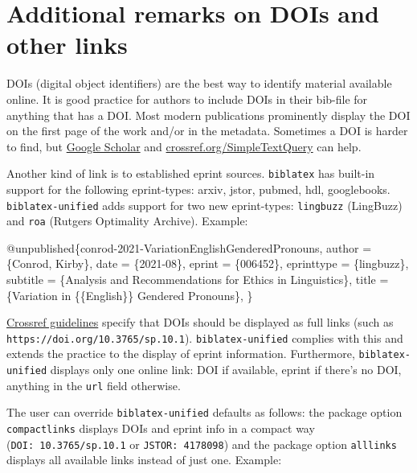 \documentclass[
]{article}
\newenvironment{Shaded}{\begin{snugshade}}{\end{snugshade}}
\newcommand{\DataTypeTok}[1]{\textcolor[rgb]{0.00,0.34,0.68}{#1}}
\newcommand{\NormalTok}[1]{\textcolor[rgb]{0.12,0.11,0.11}{#1}}
\newcommand{\OtherTok}[1]{\textcolor[rgb]{0.00,0.43,0.16}{#1}}
\newcommand{\VariableTok}[1]{\textcolor[rgb]{0.00,0.34,0.68}{#1}}
\begin{document}
\hypertarget{additional-remarks-on-dois-and-other-links}{%
\section{Additional remarks on DOIs and other
links}\label{additional-remarks-on-dois-and-other-links}}

DOIs (digital object identifiers) are the best way to identify material
available online. It is good practice for authors to include DOIs in
their bib-file for anything that has a DOI. Most modern publications
prominently display the DOI on the first page of the work and/or in the
metadata. Sometimes a DOI is harder to find, but
\href{http://scholar.google.com/}{Google Scholar} and
\href{http://crossref.org/SimpleTextQuery/}{crossref.org/SimpleTextQuery}
can help.

Another kind of link is to established eprint sources. \texttt{biblatex}
has built-in support for the following eprint-types: arxiv, jstor,
pubmed, hdl, googlebooks. \texttt{biblatex-unified} adds support for two
new eprint-types: \texttt{lingbuzz} (LingBuzz) and \texttt{roa} (Rutgers
Optimality Archive). Example:

\begin{Shaded}
\begin{Highlighting}[]
\VariableTok{@unpublished}\NormalTok{\{}\OtherTok{conrod}\NormalTok{{-}}\OtherTok{2021}\NormalTok{{-}}\OtherTok{VariationEnglishGenderedPronouns}\NormalTok{,}
  \DataTypeTok{author}\NormalTok{     = \{Conrod, Kirby\},}
  \DataTypeTok{date}\NormalTok{       = \{2021{-}08\},}
  \DataTypeTok{eprint}\NormalTok{     = \{006452\},}
  \DataTypeTok{eprinttype}\NormalTok{ = \{lingbuzz\},}
  \DataTypeTok{subtitle}\NormalTok{   = \{Analysis and Recommendations for Ethics in Linguistics\},}
  \DataTypeTok{title}\NormalTok{      = \{Variation in \{\{English\}\} Gendered Pronouns\},}
\NormalTok{\}}
\end{Highlighting}
\end{Shaded}

\href{https://www.crossref.org/display-guidelines/}{Crossref guidelines}
specify that DOIs should be displayed as full links (such as
\texttt{https://doi.org/10.3765/sp.10.1}). \texttt{biblatex-unified}
complies with this and extends the practice to the display of eprint
information. Furthermore, \texttt{biblatex-unified} displays only one
online link: DOI if available, eprint if there's no DOI, anything in the
\texttt{url} field otherwise.

The user can override \texttt{biblatex-unified} defaults as follows: the
package option \texttt{compactlinks} displays DOIs and eprint info in a
compact way (\texttt{DOI:\ 10.3765/sp.10.1} or \texttt{JSTOR:\ 4178098})
and the package option \texttt{alllinks} displays all available links
instead of just one. Example:
\end{document}
